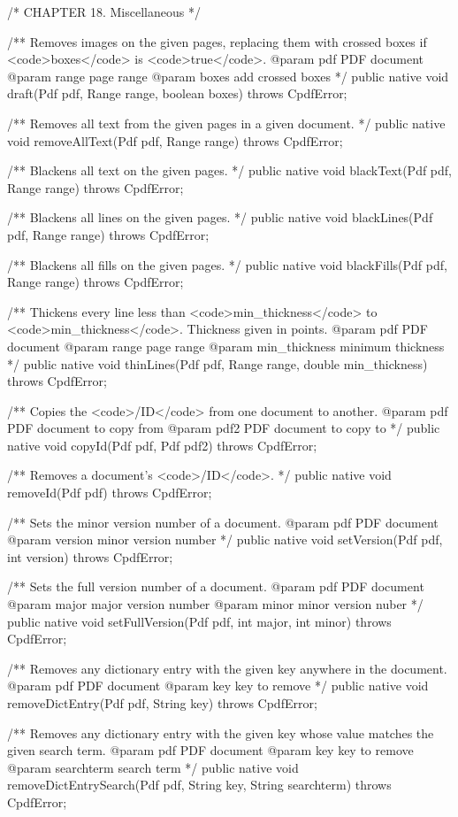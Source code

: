 /* CHAPTER 18. Miscellaneous */

/** Removes images on the given pages, replacing them with crossed boxes if
<code>boxes</code> is <code>true</code>.
@param pdf PDF document
@param range page range
@param boxes add crossed boxes */
public native void draft(Pdf pdf, Range range, boolean boxes)
    throws CpdfError;

/** Removes all text from the given pages in a given document. */
public native void removeAllText(Pdf pdf, Range range) throws CpdfError;

/** Blackens all text on the given pages. */
public native void blackText(Pdf pdf, Range range) throws CpdfError;

/** Blackens all lines on the given pages. */
public native void blackLines(Pdf pdf, Range range) throws CpdfError;

/** Blackens all fills on the given pages. */
public native void blackFills(Pdf pdf, Range range) throws CpdfError;

/** Thickens every line less than <code>min_thickness</code> to
<code>min_thickness</code>. Thickness given in points.
@param pdf PDF document
@param range page range
@param min_thickness minimum thickness */
public native void thinLines(Pdf pdf, Range range, double min_thickness)
    throws CpdfError;

/** Copies the <code>/ID</code> from one document to another.
@param pdf PDF document to copy from
@param pdf2 PDF document to copy to */
public native void copyId(Pdf pdf, Pdf pdf2) throws CpdfError;

/** Removes a document's <code>/ID</code>. */
public native void removeId(Pdf pdf) throws CpdfError;

/** Sets the minor version number of a document.
@param pdf PDF document
@param version minor version number */
public native void setVersion(Pdf pdf, int version) throws CpdfError;

/** Sets the full version number of a document.
@param pdf PDF document
@param major major version number
@param minor minor version nuber */
public native void setFullVersion(Pdf pdf, int major, int minor)
    throws CpdfError;

/** Removes any dictionary entry with the given key anywhere in the
document.
@param pdf PDF document
@param key key to remove */
public native void removeDictEntry(Pdf pdf, String key) throws CpdfError;

/** Removes any dictionary entry with the given key whose value matches the
given search term.
@param pdf PDF document
@param key key to remove
@param searchterm search term */
public native void removeDictEntrySearch(Pdf pdf, String key,
                                         String searchterm)
    throws CpdfError;

